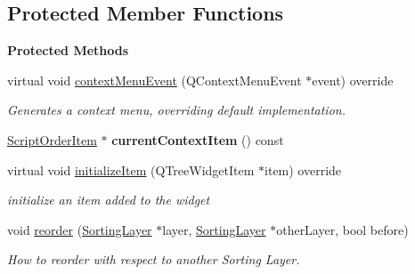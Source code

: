 \subsection*{Protected Member Functions}
\begin{Indent}\textbf{ Protected Methods}\par
\begin{DoxyCompactItemize}
\item 
virtual void \mbox{\hyperlink{classrev_1_1_view_1_1_script_order_tree_widget_a0a4a2b3e4181c650d3843f3b80bf3b14}{context\+Menu\+Event}} (Q\+Context\+Menu\+Event $\ast$event) override
\begin{DoxyCompactList}\small\item\em Generates a context menu, overriding default implementation. \end{DoxyCompactList}\item 
\mbox{\label{classrev_1_1_view_1_1_script_order_tree_widget_a7a0850c831a94177c88fdf19792da8bd}} 
\mbox{\hyperlink{classrev_1_1_view_1_1_script_order_item}{Script\+Order\+Item}} $\ast$ {\bfseries current\+Context\+Item} () const
\item 
\mbox{\label{classrev_1_1_view_1_1_script_order_tree_widget_aa035fa680c330dd64ad22f998212f1d9}} 
virtual void \mbox{\hyperlink{classrev_1_1_view_1_1_script_order_tree_widget_aa035fa680c330dd64ad22f998212f1d9}{initialize\+Item}} (Q\+Tree\+Widget\+Item $\ast$item) override
\begin{DoxyCompactList}\small\item\em initialize an item added to the widget \end{DoxyCompactList}\item 
\mbox{\label{classrev_1_1_view_1_1_script_order_tree_widget_a224e267a7f6d61cef7eb8f9cc01ef528}} 
void \mbox{\hyperlink{classrev_1_1_view_1_1_script_order_tree_widget_a224e267a7f6d61cef7eb8f9cc01ef528}{reorder}} (\mbox{\hyperlink{structrev_1_1_sorting_layer}{Sorting\+Layer}} $\ast$layer, \mbox{\hyperlink{structrev_1_1_sorting_layer}{Sorting\+Layer}} $\ast$other\+Layer, bool before)
\begin{DoxyCompactList}\small\item\em How to reorder with respect to another Sorting Layer. \end{DoxyCompactList}\item 

\end{DoxyCompactItemize}
\end{Indent}
